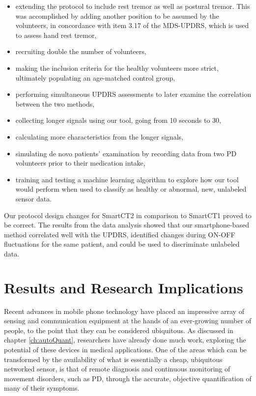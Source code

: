 \begin{itemize}
\item extending the protocol to include rest tremor as well as postural tremor. This was accomplished by adding another position to be assumed by the volunteers, in concordance with item 3.17 of the \gls{MDS}-\gls{UPDRS}, which is used to assess hand rest tremor,
\item recruiting double the number of volunteers,
\item making the inclusion criteria for the healthy volunteers more strict, ultimately populating an age-matched control group,
\item performing simultaneous \gls{UPDRS} assessments to later examine the correlation between the two methods,
\item collecting longer signals using our tool, going from 10 seconds to 30, 
\item calculating more characteristics from the longer signals,
\item simulating de novo patients' examination by recording data from two \gls{PD} volunteers prior to their medication intake,
\item training and testing a machine learning algorithm to explore how our tool would perform when used to classify as healthy or abnormal, new, unlabeled sensor data. 
\end{itemize}

\noindent
Our protocol design changes for \gls{SmartCT2} in comparison to \gls{SmartCT1} proved to be correct. The results from the data analysis showed that our smartphone-based method correlated well with the \gls{UPDRS}, identified changes during ON-OFF fluctuations for the same patient, and could be used to discriminate unlabeled data. 


\section{Results and Research Implications}
\label{sec:SmartImplications}

Recent advances in mobile phone technology have placed an impressive array of sensing and communication equipment at the hands of an ever-growing number of people, to the point that they can be considered ubiquitous. As discussed in chapter \ref{ch:autoQuant}, researchers have already done much work, exploring the potential of these devices in medical applications. One of the areas which can be transformed by the availability of what is essentially a cheap, ubiquitous networked sensor, is that of remote diagnosis and continuous monitoring of movement disorders, such as \gls{PD}, through the accurate, objective quantification of many of their symptoms. 

